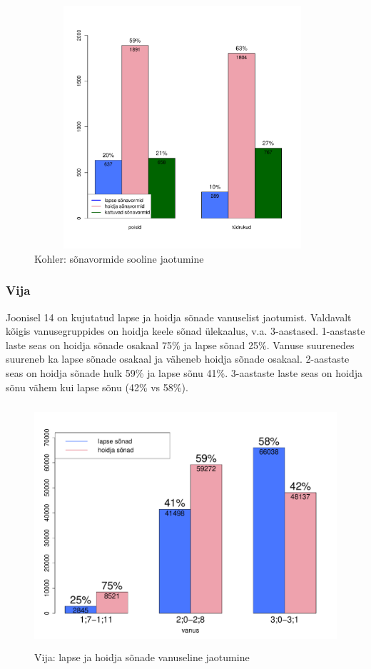 \documentclass[12pt]{article}
\begin{document}
\begin{figure}[H]
    \centering
    \includegraphics[width=11cm, height=9cm]{kohler_sonavormid_sugu}
    \caption{Kohler: sõnavormide sooline jaotumine}
\end{figure}


\subsubsection{Vija}

Joonisel 14 on kujutatud lapse ja hoidja sõnade vanuselist jaotumist. Valdavalt kõigis vanusegruppides on hoidja keele sõnad ülekaalus, v.a. 3-aastased. 1-aastaste laste seas on hoidja sõnade osakaal 75\% ja lapse sõnad 25\%. Vanuse suurenedes suureneb ka lapse sõnade osakaal ja väheneb hoidja sõnade osakaal. 2-aastaste seas on hoidja sõnade hulk 59\% ja lapse sõnu 41\%. 3-aastaste laste seas on hoidja sõnu vähem kui lapse sõnu (42\% vs 58\%).

\begin{figure}[H]
    \centering
    \includegraphics[width=12cm, height=9cm]{vija_vanus_sonad}
    \caption{Vija: lapse ja hoidja sõnade vanuseline jaotumine}
\end{figure}
\end{document}
